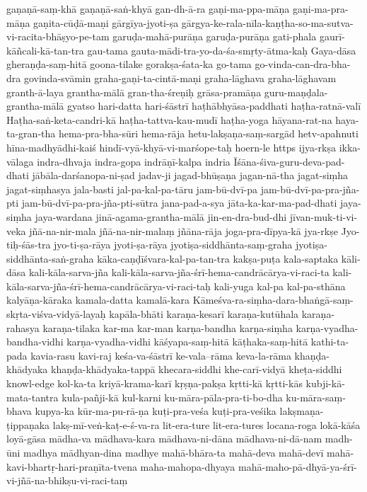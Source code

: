 {gaṇaṇā-saṃ-khā
gaṇaṇā-saṅ-khyā
gan-dh-ā-ra
gaṇi-ma-ppa-māṇa
gaṇi-ma-pra-māṇa
gaṇita-cūḍā-maṇi
gārgīya-jyoti-ṣa
gārgya-ke-rala-nīla-kaṇṭha-so-ma-sutva-vi-racita-bhāṣyo-pe-tam
garuḍa-mahā-purāṇa
garuḍa-purāṇa
gati-phala
gaurī-kāñcali-kā-tan-tra
gau-tama
gauta-mādi-tra-yo-da-śa-smṛty-ātma-kaḥ
Gaya-dāsa
gheraṇḍa-saṃ-hitā
goona-tilake
gorakṣa-śata-ka
go-tama
go-vinda-can-dra-bha-dra
govinda-svāmin
graha-gaṇi-ta-cintā-maṇi
graha-lāghava
graha-lāghavam
granth-ā-laya
grantha-mālā
gran-tha-śreṇiḥ
grāsa-pramāṇa
guru-maṇḍala-grantha-mālā
gyatso
hari-datta
hari-śāstrī
haṭhābhyāsa-paddhati
haṭha-ratnā-valī
Haṭha-saṅ-keta-candri-kā
haṭha-tattva-kau-mudī
haṭha-yoga
hāyana-rat-na
haya-ta-gran-tha
hema-pra-bha-sūri
hema-rāja
hetu-lakṣaṇa-saṃ-sargād
hetv-apahnuti
hīna-madhyādhi-kaiś
hindī-vyā-khyā-vi-marśope-taḥ
hoern-le
https
ijya-rkṣa
ikka-vālaga
indra-dhvaja
indra-gopa
indrāṇī-kalpa
indria
Īśāna-śiva-guru-deva-pad-dhati
jābāla-darśanopa-ni-ṣad
jadav-ji
jagad-bhūṣaṇa
jagan-nā-tha
jagat-siṃha
jagat-siṃhasya
jala-basti
jal-pa-kal-pa-tāru
jam-bū-dvī-pa
jam-bū-dvī-pa-pra-jña-pti
jam-bū-dvī-pa-pra-jña-pti-sūtra
jana-pad-a-sya
jāta-ka-kar-ma-pad-dhati
jaya-siṃha
jaya-wardana
jinā-agama-grantha-mālā
jin-en-dra-bud-dhi
jīvan-muk-ti-vi-veka
jñā-na-nir-mala
jñā-na-nir-malaṃ
jñāna-rāja
joga-pra-dīpya-kā
jya-rkṣe
Jyo-tiḥ-śās-tra
jyo-ti-ṣa-rāya
jyoti-ṣa-rāya
jyotiṣa-siddhānta-saṃ-graha
jyotiṣa-siddhānta-saṅ-graha
kāka-caṇḍīśvara-kal-pa-tan-tra
kakṣa-puṭa
kala-saptaka
kāli-dāsa
kali-kāla-sarva-jña
kali-kāla-sarva-jña-śrī-hema-candrācārya-vi-raci-ta
kali-kāla-sarva-jña-śrī-hema-candrācārya-vi-raci-taḥ
kali-yuga
kal-pa
kal-pa-sthāna
kalyāṇa-kāraka
kamala-datta
kamalā-kara
Kāmeśva-ra-siṃha-dara-bhaṅgā-saṃ-skṛta-viśva-vidyā-layaḥ
kapāla-bhāti
karaṇa-kesarī
karaṇa-kutūhala
karaṇa-rahasya
karaṇa-tilaka
kar-ma
kar-man
karṇa-bandha
karṇa-siṃha
karṇa-vyadha-bandha-vidhi
karṇa-vyadha-vidhi
kāśyapa-saṃ-hitā
kāṭhaka-saṃ-hitā
kathi-ta-pada
kavia-rasu
kavi-raj
keśa-va-śāstrī
ke-vala--rāma
keva-la-rāma
khaṇḍa-khādyaka
khaṇḍa-khādyaka-tappā
khecara-siddhi
khe-carī-vidyā
kheṭa-siddhi
knowl-edge
kol-ka-ta
kriyā-krama-karī
kṛṣṇa-pakṣa
kṛtti-kā
kṛtti-kās
kubji-kā-mata-tantra
kula-pañji-kā
kul-karni
ku-māra-pāla-pra-ti-bo-dha
ku-māra-saṃ-bhava
kupya-ka
kūr-ma-pu-rā-ṇa
kuṭi-pra-veśa
kuṭi-pra-veśika
lakṣmaṇa-ṭippaṇaka
lakṣ-mī-veṅ-kaṭ-e-ś-va-ra
lit-era-ture
lit-era-tures
locana-roga
lokā-kāśa
loyā-gāsa
mādha-va
mādhava-kara
mādhava-ni-dāna
mādhava-ni-dā-nam
madh-ūni
madhya
mādhyan-dina
madhye
mahā-bhāra-ta
mahā-deva
mahā-devī
mahā-kavi-bhartṛ-hari-praṇīta-tvena
maha-mahopa-dhyaya
mahā-maho-pā-dhyā-ya-śrī-vi-jñā-na-bhikṣu-vi-raci-taṃ
}
